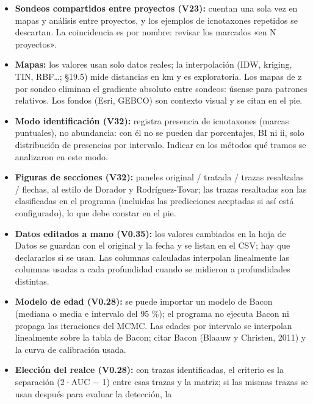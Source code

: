 \documentclass[
  10pt,
]{article}
\begin{document}
\begin{itemize}
  \textbf{Selección de modelo:} comparar varios clasificadores con la
  misma validación y quedarse con el mejor \textbf{sesga el acierto al
  alza}. Un artículo debe informar de todos los modelos probados o
  reservar sondeos para una prueba final independiente (pendiente de
  implementar en la interfaz).
\item
  \textbf{Sondeos compartidos entre proyectos (V23):} cuentan una sola
  vez en mapas y análisis entre proyectos, y los ejemplos de icnotaxones
  repetidos se descartan. La coincidencia es por nombre: revisar los
  marcados «en N proyectos».
\item
  \textbf{Mapas:} los valores usan solo datos reales; la interpolación
  (IDW, kriging, TIN, RBF\ldots; §19.5) mide distancias en km y es
  exploratoria. Los mapas de z por sondeo eliminan el gradiente absoluto
  entre sondeos: úsense para patrones relativos. Los fondos (Esri,
  GEBCO) son contexto visual y se citan en el pie.
\item
  \textbf{Modo identificación (V32):} registra presencia de icnotaxones
  (marcas puntuales), no abundancia: con él no se pueden dar
  porcentajes, BI ni ii, solo distribución de presencias por intervalo.
  Indicar en los métodos qué tramos se analizaron en este modo.
\item
  \textbf{Figuras de secciones (V32):} paneles original / tratada /
  trazas resaltadas / flechas, al estilo de Dorador y Rodríguez-Tovar;
  las trazas resaltadas son las clasificadas en el programa (incluidas
  las predicciones aceptadas si así está configurado), lo que debe
  constar en el pie.
\item
  \textbf{Datos editados a mano (V0.35):} los valores cambiados en la
  hoja de Datos se guardan con el original y la fecha y se listan en el
  CSV; hay que declararlos si se usan. Las columnas calculadas
  interpolan linealmente las columnas usadas a cada profundidad cuando
  se midieron a profundidades distintas.
\item
  \textbf{Modelo de edad (V0.28):} se puede importar un modelo de Bacon
  (mediana o media e intervalo del 95 \%); el programa no ejecuta Bacon
  ni propaga las iteraciones del MCMC. Las edades por intervalo se
  interpolan linealmente sobre la tabla de Bacon; citar Bacon (Blaauw y
  Christen, 2011) y la curva de calibración usada.
\item
  \textbf{Elección del realce (V0.28):} con trazas identificadas, el
  criterio es la separación (2·AUC − 1) entre esas trazas y la matriz;
  si las mismas trazas se usan después para evaluar la detección, la

\end{itemize}
\end{document}
